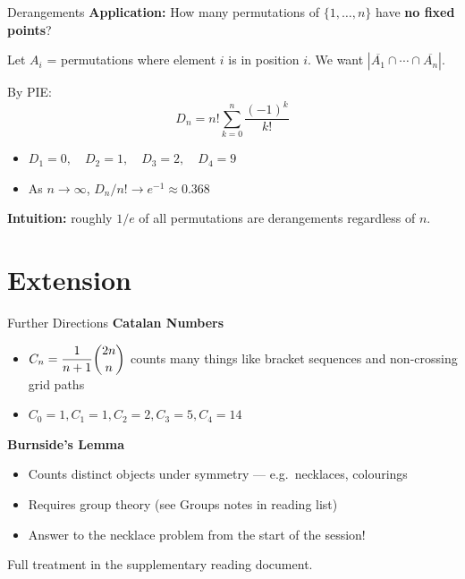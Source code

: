 \documentclass{beamer}
\begin{document}
\begin{frame}{Derangements}
    \textbf{Application:} How many permutations of $\{1, \dots, n\}$ have \textbf{no fixed points}?

    \vspace{0.5em}

    Let $A_i$ = permutations where element $i$ is in position $i$. We want $\left|\overline{A_1} \cap \cdots \cap \overline{A_n}\right|$.

    By PIE:
    $$D_n = n!\sum_{k=0}^{n} \frac{(-1)^k}{k!}$$

    \vspace{0.3em}

    \begin{itemize}
        \item $D_1 = 0, \quad D_2 = 1, \quad D_3 = 2, \quad D_4 = 9$
        \item As $n \to \infty$, $D_n / n! \to e^{-1} \approx 0.368$
    \end{itemize}

    \vspace{0.3em}

    \textbf{Intuition:} roughly $1/e$ of all permutations are derangements regardless of $n$.
\end{frame}

\section{Extension}

\begin{frame}{Further Directions}
     \textbf{Catalan Numbers}
    \begin{itemize}
        \item $C_n = \dfrac{1}{n+1}\dbinom{2n}{n}$ counts many things like bracket sequences and non-crossing grid paths
        \item $C_0=1, C_1=1, C_2=2, C_3=5, C_4=14$
    \end{itemize}

    \vspace{0.5em}

    \textbf{Burnside's Lemma}
    \begin{itemize}
        \item Counts distinct objects under symmetry --- e.g.\ necklaces, colourings
        \item Requires group theory (see Groups notes in reading list)
        \item Answer to the necklace problem from the start of the session!
    \end{itemize}

    \vspace{0.5em}

    Full treatment in the supplementary reading document.
    
\end{frame}
\end{document}
